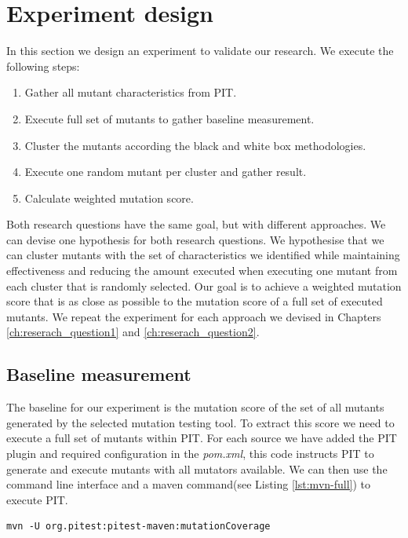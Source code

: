 \documentclass[conference,draftclsnofoot,onecolumn]{IEEEtran}
\begin{document}
\section{Experiment design}
In this section we design an experiment to validate our research.
We execute the following steps:
\begin{enumerate}
    \item Gather all mutant characteristics from PIT.
    \item Execute full set of mutants to gather baseline measurement.
    \item Cluster the mutants according the black and white box methodologies.
    \item Execute one random mutant per cluster and gather result.
    \item Calculate weighted mutation score.
\end{enumerate}
Both research questions have the same goal, but with different approaches.
We can devise one hypothesis for both research questions.
We hypothesise that we can cluster mutants with the set of characteristics we identified
while maintaining effectiveness and reducing the amount executed when executing one mutant from each cluster that is randomly selected.
Our goal is to achieve a weighted mutation score that is as close as possible to the mutation score of a full set of executed mutants.
We repeat the experiment for each approach we devised in Chapters \ref{ch:reserach_question1} and \ref{ch:reserach_question2}.

\subsection{Baseline measurement}
The baseline for our experiment is the mutation score of the set of all mutants generated by the selected mutation testing tool.
To extract this score we need to execute a full set of mutants within PIT.
For each source we have added the PIT plugin and required configuration in the \textit{pom.xml}, this code instructs PIT to generate and execute mutants with all mutators available.
We can then use the command line interface and a maven command(see Listing \ref{lst:mvn-full}) to execute PIT.
\begin{lstlisting}[label=lst:mvn-full,caption=Command used to execute full set of mutants with PIT.]
mvn -U org.pitest:pitest-maven:mutationCoverage
\end{lstlisting}
\end{document}
